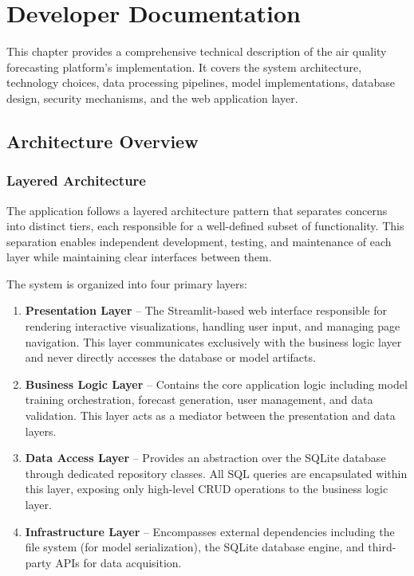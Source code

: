 \chapter{Developer Documentation}
\label{ch:impl}

This chapter provides a comprehensive technical description of the air quality forecasting platform's implementation. It covers the system architecture, technology choices, data processing pipelines, model implementations, database design, security mechanisms, and the web application layer.

\section{Architecture Overview}
\label{sec:architecture}

\subsection{Layered Architecture}

The application follows a layered architecture pattern that separates concerns into distinct tiers, each responsible for a well-defined subset of functionality. This separation enables independent development, testing, and maintenance of each layer while maintaining clear interfaces between them.

The system is organized into four primary layers:

\begin{enumerate}
    \item \textbf{Presentation Layer} -- The Streamlit-based web interface responsible for rendering interactive visualizations, handling user input, and managing page navigation. This layer communicates exclusively with the business logic layer and never directly accesses the database or model artifacts.
    
    \item \textbf{Business Logic Layer} -- Contains the core application logic including model training orchestration, forecast generation, user management, and data validation. This layer acts as a mediator between the presentation and data layers.
    
    \item \textbf{Data Access Layer} -- Provides an abstraction over the SQLite database through dedicated repository classes. All SQL queries are encapsulated within this layer, exposing only high-level CRUD operations to the business logic layer.
    
    \item \textbf{Infrastructure Layer} -- Encompasses external dependencies including the file system (for model serialization), the SQLite database engine, and third-party APIs for data acquisition.
\end{enumerate}

